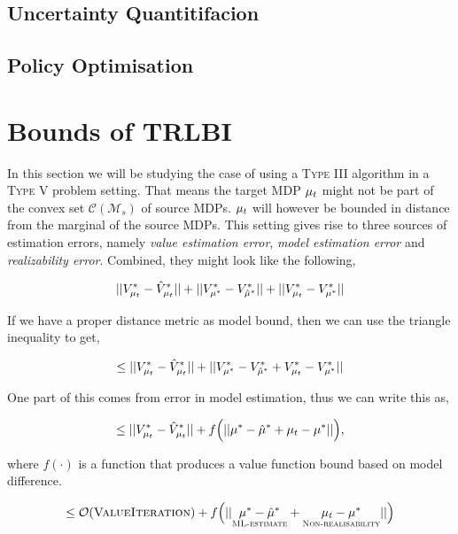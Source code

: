 \subsection{Uncertainty Quantitifacion}

\subsection{Policy Optimisation}
\fi

\section{Bounds of TRLBI}\label{sec:bounds}

In this section we will be studying the case of using a \textsc{Type III} algorithm in a \textsc{Type V} problem setting. That means the target MDP $\mu_t$ might not be part of the convex set $\mathcal{C}(\mathcal{M}_s)$ of source MDPs. $\mu_t$ will however be bounded in distance from the marginal of the source MDPs. This setting gives rise to three sources of estimation errors, namely \emph{value estimation error}, \emph{model estimation error} and \emph{realizability error}. Combined, they might look like the following,

\begin{equation}
    ||V^{*}_{\mu_t}-\hat{V}^{*}_{\mu_t}|| + ||V^{*}_{\mu^{*}}-V^{*}_{\hat{\mu}^{*}}||+||V^{*}_{\mu_t}-V^{*}_{\mu^{*}}||
\end{equation}

If we have a proper distance metric as model bound, then we can use the triangle inequality to get,

\begin{equation}
\leq 
    ||V^{*}_{\mu_t}-\hat{V}^{*}_{\mu_t}|| + ||V^{*}_{\mu^{*}}-V^{*}_{\hat{\mu}^{*}}+V^{*}_{\mu_t}-V^{*}_{\mu^{*}}||
\end{equation}

One part of this comes from error in model estimation, thus we can write this as,

\begin{equation}
\leq 
    ||V^{*}_{\mu_t}-\hat{V}^{*}_{\mu_t}|| + f\Big(||{\mu^{*}}-\hat{\mu}^{*}+{\mu_t}-{\mu^{*}}||\Big),
\end{equation}

where $f(\cdot)$ is a function that produces a value function bound based on model difference.

\begin{equation}
    \leq \mathcal{O}(\textsc{ValueIteration}) + f\Big(||\underset{\textsc{ML-estimate}}{{\mu^{*}}-\hat{\mu}^{*}}+\underset{\textsc{Non-realisability}}{{\mu_t}-{\mu^{*}}}||\Big)
\end{equation}

